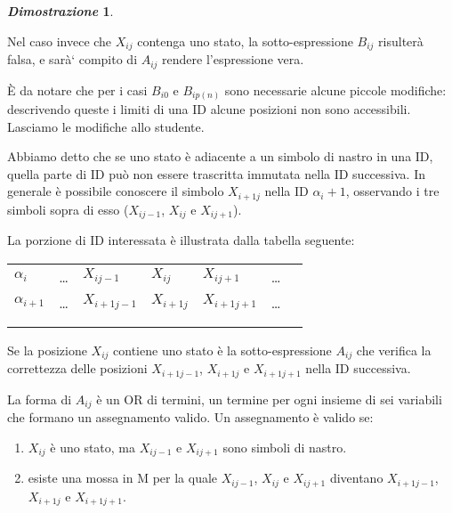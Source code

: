 \documentclass[12pt]{article}
\theoremstyle{definition}
\newtheorem*{myproof}{\em Dimostrazione}
\begin{document}
\begin{myproof}
\begin{description}
    Nel caso invece che \(X_{ij}\) contenga uno stato, la sotto-espressione \(B_{ij}\) risulter\`a falsa, e sar\`a` compito
    di \(A_{ij}\) rendere l'espressione vera.

    \`E da notare che per i casi \(B_{i0}\) e \(B_{ip(n)}\) sono necessarie alcune piccole modifiche: descrivendo
    queste i limiti di una ID alcune posizioni non sono accessibili. Lasciamo le modifiche allo studente. \newline

    Abbiamo detto che se uno stato \`e adiacente a un simbolo di nastro in una ID, quella parte di ID pu\`o non
    essere trascritta immutata nella ID successiva. In generale \`e possibile conoscere il simbolo \(X_{i+1j}\)
    nella ID \(\alpha_i+1\), osservando i tre simboli sopra di esso (\(X_{ij-1}\), \(X_{ij}\) e \(X_{ij+1}\)). \newline

    La porzione di ID interessata \`e illustrata dalla tabella seguente:
    \begin{table}[!ht]
      \centering
      \begin{tabular}{lllllll}
        \cline{2-6}
        \multicolumn{1}{l}{\(\alpha_i\)} & \multicolumn{1}{|l|}{\ldots} & \multicolumn{1}{l|}{\(X_{ij-1}\)} & \multicolumn{1}{l|}{\(X_{ij}\)} & \multicolumn{1}{l|}{\(X_{ij+1}\)} & \multicolumn{1}{l|}{\ldots} &  \\ \cline{2-6}
        \multicolumn{1}{l}{\(\alpha_{i+1}\)} & \multicolumn{1}{|l|}{\ldots} & \multicolumn{1}{l|}{\(X_{i+1j-1}\)} & \multicolumn{1}{l|}{\(X_{i+1j}\)} & \multicolumn{1}{l|}{\(X_{i+1j+1}\)} & \multicolumn{1}{l|}{\ldots} &  \\ \cline{2-6}
        &                       &                       &                       &                       &  \\
        &                       &                       &                       &                       &
      \end{tabular}
    \end{table}
    
    Se la posizione \(X_{ij}\) contiene uno stato \`e la sotto-espressione \(A_{ij}\) che
    verifica la correttezza delle posizioni \(X_{i+1j-1}\), \(X_{i+1j}\) e \(X_{i+1j+1}\)
    nella ID successiva. \newline

    La forma di \(A_{ij}\) \`e un OR di termini, un termine per ogni insieme di sei variabili
    che formano un assegnamento valido. Un assegnamento \`e valido se:\newline
    \begin{enumerate}
    \item \(X_{ij}\) \`e uno stato, ma \(X_{ij-1}\) e \(X_{ij+1}\) sono simboli di nastro.\newline
    \item esiste una mossa in M per la quale \(X_{ij-1}\), \(X_{ij}\) e \(X_{ij+1}\) diventano \(X_{i+1j-1}\), \(X_{i+1j}\) e \(X_{i+1j+1}\).
    \end{enumerate}
    \ \newline
    

\end{description}
\end{myproof}
\end{document}
